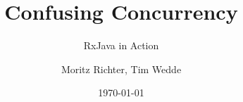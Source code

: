 \documentclass[xcolor=table]{beamer}
\title{Confusing Concurrency}
\subtitle{RxJava in Action}
\author{Moritz Richter, Tim Wedde}
\institute {
  Enterprise System Whatever \\
  \bigskip
  FH Techniek en Logistiek \\
  Venlo
}
\date{\today}
\begin{document}
\begin{frame}
  \titlepage
\end{frame}














\end{document}

